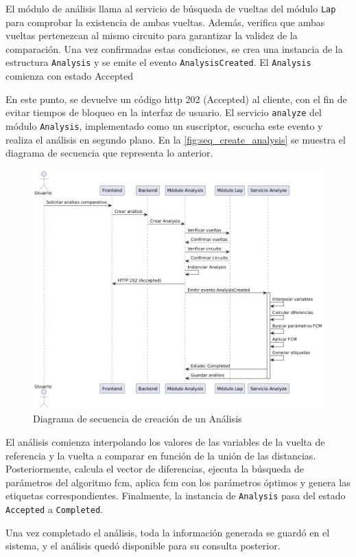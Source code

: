 El módulo de análisis llama al servicio de búsqueda de vueltas del módulo \texttt{Lap} para comprobar la existencia de ambas vueltas. Además, verifica que ambas vueltas pertenezcan al mismo circuito para garantizar la validez de la comparación. Una vez confirmadas estas condiciones, se crea una instancia de la estructura \texttt{Analysis} y se emite el evento \texttt{AnalysisCreated}. El \texttt{Analysis} comienza con estado Accepted

En este punto, se devuelve un código \ac{http} 202 (Accepted) al cliente, con el fin de evitar tiempos de bloqueo en la interfaz de usuario. El servicio \texttt{analyze} del módulo \texttt{Analysis}, implementado como un suscriptor, escucha este evento y realiza el análisis en segundo plano. En la \autoref{fig:seq_create_analysis} se muestra el diagrama de secuencia que representa lo anterior.

\begin{figure}[H]
\centering
\includegraphics[width=0.6\linewidth]{./figs/herramientas/desarrollo/seq_create_analysis.png}
\caption[Diagrama de secuencia de creación de un Análisis]{Diagrama de secuencia de creación de un Análisis}
\label{fig:seq_create_analysis}
\end{figure}

El análisis comienza interpolando los valores de las variables de la vuelta de referencia y la vuelta a comparar en función de la unión de las distancias. Posteriormente, calcula el vector de diferencias, ejecuta la búsqueda de parámetros del algoritmo \ac{fcm}, aplica \ac{fcm} con los parámetros óptimos y genera las etiquetas correspondientes. Finalmente, la instancia de \texttt{Analysis} pasa del estado \texttt{Accepted} a \texttt{Completed}.

Una vez completado el análisis, toda la información generada se guardó en el sistema, y el análisis quedó disponible para su consulta posterior.

